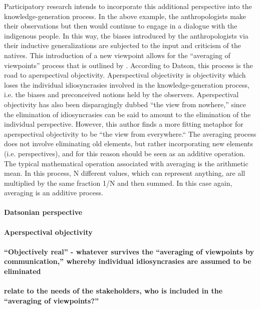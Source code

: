 \documentclass[a4paper]{article}
\begin{document}
Participatory research intends to incorporate this additional perspective into
the knowledge-generation process. In the above example, the anthropologists
make their observations but then would continue to engage in a dialogue with
the indigenous people. In this way, the biases introduced by the
anthropologists via their inductive generalizations are subjected to the input
and criticism of the natives. This introduction of a new viewpoint allows for
the ``averaging of viewpoints'' process that is outlined by
\cite{datson1992objectivity}. According to Datson, this process is the road to
aperspectival objectivity.  Aperspectival objectivity is objectivity which
loses the individual idiosyncrasies involved in the knowledge-generation
process, i.e. the biases and preconceived notions held by the observers.
Aperspectival objectivity has also been disparagingly dubbed ``the view from
nowhere,'' since the elimination of idiosyncrasies can be said to amount to the
elimination of the individual perspective. However, this author finds a more
fitting metaphor for aperspectival objectivity to be ``the view from
everywhere.`` The averaging process does not involve eliminating old elements,
but rather incorporating new elements (i.e.  perspectives), and for this reason
should be seen as an additive operation.  The typical mathematical operation
associated with averaging is the arithmetic mean. In this process, N different
values, which can represent anything, are all multiplied by the same fraction
1/N and then summed. In this case again, averaging is an additive process.

\paragraph{Datsonian perspective}

\paragraph{Aperspectival objectivity}

\paragraph{``Objectively real'' - whatever survives the ``averaging of viewpoints
by communication,'' whereby individual idiosyncrasies are assumed to be
eliminated}

\paragraph{relate to the needs of the stakeholders, who is included in the
``averaging of viewpoints?''}
\end{document}

